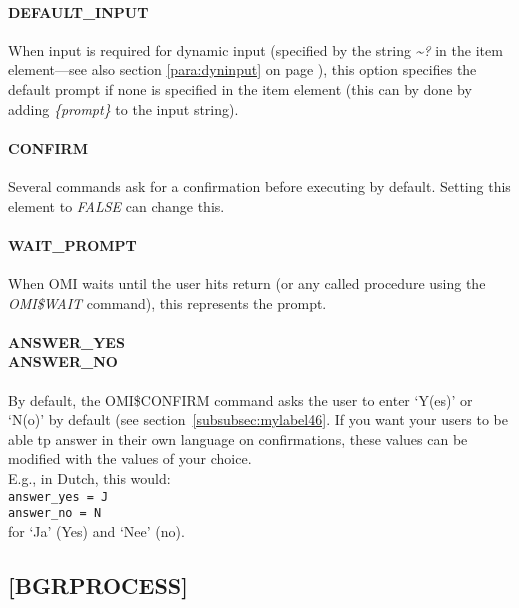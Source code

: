 \documentclass[a4paper]{book}
\renewcommand{\indent}{\hspace*{5mm}}
\begin{document}
\paragraph{DEFAULT{\_}INPUT}

When input is required for dynamic input (specified by the string \textsl{\~{}?} in the item 
element---see also section \ref{para:dyninput} on page \pageref{para:dyninput}),
this option specifies the default prompt if none is specified in 
the item element (this can by done by adding \textsl{{\{}\textit{prompt}{\}}} to the input string).

\paragraph{CONFIRM}
\label{para:confirmput}

Several commands ask for a confirmation
before executing by default. Setting this element to \textsl{FALSE} can change this.

\paragraph{WAIT{\_}PROMPT}

When OMI waits until the user hits return (or any called procedure using the 
\textsl{OMI{\$}WAIT} command), this 
represents the prompt.

\paragraph{ANSWER{\_}YES\\ANSWER{\_}NO}

By default, the \textsf{OMI{\$}CONFIRM} command asks the user to enter `Y(es)' or `N(o)' by
default (see section~\ref{subsubsec:mylabel46}. If you want your users to be able tp
answer in their own language on confirmations, these values can be modified with the
values of your choice.\\
E.g., in Dutch, this would: \\
\indent\texttt{answer{\_}yes = J}\\
\indent\texttt{answer{\_}no = N}\\
for `Ja' (Yes) and `Nee' (no).

\subsection{[BGRPROCESS]}
\label{subsubsec:mylabel19}
\end{document}
